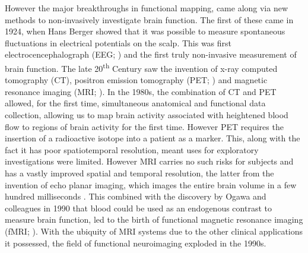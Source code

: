 However the major breakthroughs in functional mapping, came along via new methods to non-invasively investigate brain function. The first of these came in 1924, when Hans Berger showed that it was possible to measure spontaneous fluctuations in electrical potentials on the scalp. This was first electrocencephalograph (EEG; \citealp{Berger1929}) and the first truly non-invasive measurement of brain function. The late 20\textsuperscript{th} Century saw the invention of x-ray computed tomography (CT), positron emission tomography (PET; \citealp{Fox1984}) and magnetic resonance imaging (MRI; \citealp{Lauterber1973,Mansfield1973}). In the 1980s, the combination of CT and PET allowed, for the first time, simultaneous anatomical and functional data collection, allowing us to map brain activity associated with heightened blood flow to regions of brain activity for the first time. However PET requires the insertion of a radioactive isotope into a patient as a marker. This, along with the fact it has poor spatiotemporal resolution, meant uses for exploratory investigations were limited. However MRI carries no such risks for subjects and has a vastly improved spatial and temporal resolution, the latter from the invention of echo planar imaging, which images the entire brain volume in a few hundred milliseconds \citep{Mansfield1977}. This combined with the discovery by Ogawa and colleagues in 1990 that blood could be used as an endogenous contrast to measure brain function, led to the birth of functional magnetic resonance imaging (fMRI; \citealp{Ogawa1990}). With the ubiquity of MRI systems due to the other clinical applications it possessed, the field of functional neuroimaging exploded in the 1990s. 

